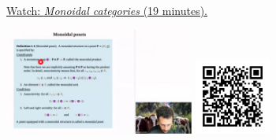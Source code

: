 
\begin{minipage}{10cm}
    \href{https://act4e-spring21.netlify.app/videos/spring2021-par-feedback:mon-cat.html}{Watch: \emph{Monoidal categories} (19 minutes).}
        
    \href{https://act4e-spring21.netlify.app/videos/spring2021-par-feedback:mon-cat.html}{\includegraphics[height=3.5cm]{spring2021-par-feedback:mon-cat/thumbnails.jpg}}
    \href{https://act4e-spring21.netlify.app/videos/spring2021-par-feedback:mon-cat.html}{\includegraphics[height=2.5cm]{spring2021-par-feedback:mon-cat/qrcode.png}}
\end{minipage}
